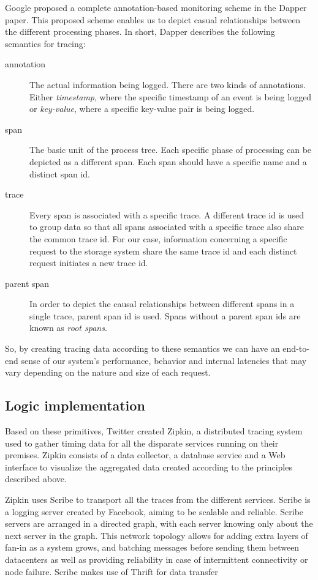 \documentclass[a4paper,10pt,twocolumn]{article}
\begin{document}
Google proposed a complete annotation-based monitoring scheme in the Dapper
paper\cite{dapper}. This proposed scheme enables us to depict casual
relationships between the different processing phases. In short, Dapper
describes the following semantics for tracing:
\begin{description}
\item[annotation]
The actual information being logged. There are two kinds of annotations. Either
\emph{timestamp}, where the specific timestamp of an event is being logged or 
\emph{key-value}, where a specific key-value pair is being logged.
\item[span]
The basic unit of the process tree. Each specific phase of processing can be 
depicted as a different span. Each span should have a specific name and a 
distinct span id.
\item[trace]
Every span is associated with a specific trace. A different trace id is used 
to group data so that all spans associated with a specific trace also share the
common trace id. For our case, information concerning a specific request to the
storage system share the same trace id and each distinct request initiates a new
trace id.
\item[parent span] 
In order to depict the causal relationships between different spans in a single
trace, parent span id is used. Spans without a parent span ids are  known as 
\emph{root spans}.
\end{description}

So, by creating tracing data according to these semantics we can have an
end-to-end sense of our system's performance, behavior and internal latencies
that may vary depending on the nature and size of each request.

\subsection{Logic implementation} Based on these primitives, Twitter created
Zipkin\cite{zipkin}, a distributed tracing system used to gather timing data for
all the disparate services running on their premises. Zipkin consists of a data
collector, a database service and a Web interface to visualize the aggregated
data created according to the principles described above.

Zipkin uses Scribe\cite{scribe} to transport all the traces from the different
services. Scribe is a logging server created by Facebook, aiming to be scalable
and reliable. Scribe servers are arranged in a directed graph, with each server
knowing only about the next server in the graph. This network topology allows
for adding extra layers of fan-in as a system grows, and batching messages
before sending them between datacenters as well as providing reliability in case
of intermittent connectivity or node failure. Scribe makes use of
Thrift\cite{thift} for data transfer
\end{document}
